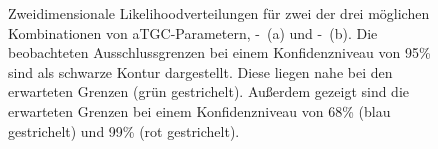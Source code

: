 \begin{figure}
	\centering
	\caption[Zweidimensionale Likelihoodverteilungen für zwei mögliche Kombinationen von aTGC-Parametern]{Zweidimensionale Likelihoodverteilungen für zwei der drei möglichen Kombinationen von aTGC-Parametern, \Tcwww -\Tcb \ (a) und \Tccw -\Tcb \ (b). Die beobachteten Ausschlussgrenzen bei einem Konfidenzniveau von 95\% sind als schwarze Kontur dargestellt. Diese liegen nahe bei den erwarteten Grenzen (grün gestrichelt). Außerdem gezeigt sind die erwarteten Grenzen bei einem Konfidenzniveau von 68\% (blau gestrichelt) und 99\% (rot gestrichelt).}
	\label{fig:intro_ger:2d}	
\end{figure}
